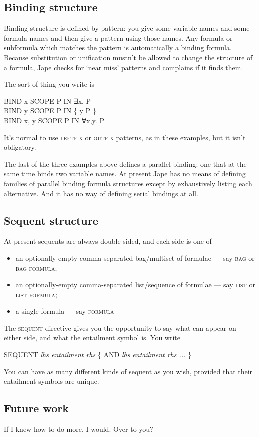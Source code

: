 \subsection{Binding structure}

Binding structure is defined by pattern: you give some variable names and some formula names and then give a pattern using those names. Any formula or subformula which matches the pattern is automatically a binding formula. Because substitution or unification mustn't be allowed to change the structure of a formula, Jape checks for `near miss' patterns and complains if it finds them.

The sort of thing you write is

\begin{japeish}
BIND x SCOPE P IN ∃x. P\\
BIND y SCOPE P IN \{ y {\textbar} P \}\\
BIND x, y SCOPE P IN ∀x,y. P
\end{japeish}


It's normal to use \textsc{leftfix} or \textsc{outfix} patterns, as in these examples, but it isn't obligatory.

The last of the three examples above defines a parallel binding: one that at the same time binds two variable names. At present Jape has no means of defining families of parallel binding formula structures except by exhaustively listing each alternative. And it has no way of defining serial bindings at all.

\subsection{Sequent structure}

At present sequents are always double-sided, and each side is one of

\begin{itemize}
\item an optionally-empty comma-separated bag/multiset of formulae --- say \textsc{bag} or \textsc{bag formula};
\item an optionally-empty comma-separated list/sequence of formulae --- say \textsc{list} or \textsc{list formula};
\item a single formula --- say \textsc{formula}
\end{itemize}

The \textsc{sequent} directive gives you the opportunity to say what can appear on either side, and what the entailment symbol is. You write

\begin{japeish}
SEQUENT \textit{lhs entailment rhs} \{ AND \textit{lhs entailment rhs ...} \}
\end{japeish}


You can have as many different kinds of sequent as you wish, provided that their entailment symbols are unique.

\subsection{Future work}

If I knew how to do more, I would. Over to you?

